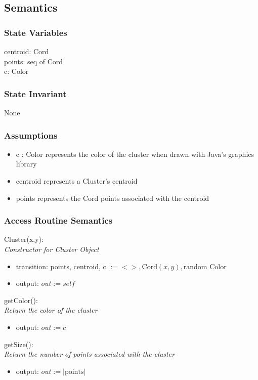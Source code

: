 \documentclass[12pt]{article}
\begin{document}
\subsection* {Semantics}

\subsubsection* {State Variables}
centroid: Cord\\
points: seq of Cord\\
c: Color

\subsubsection* {State Invariant}

None

\subsubsection* {Assumptions}
\begin{itemize}
\item c : Color represents the color of the cluster when drawn with Java's graphics
library
\item centroid represents a Cluster's centroid
\item points represents the Cord points associated with the centroid
\end{itemize}

\subsubsection* {Access Routine Semantics}

Cluster(x,y):\\
\textit{Constructor for Cluster Object}
\begin{itemize}
\item transition: points, centroid, c $:=  <>, \mbox{Cord}(x,y), \mbox{random Color}$
\item output: $out := \mathit{self}$
\end{itemize}

\noindent
getColor():\\
\textit{Return the color of the cluster}
\begin{itemize}
\item output: $out := c$
\end{itemize}

\noindent
getSize():\\
\textit{Return the number of points associated with the cluster}
\begin{itemize}
\item output: $out := |\mbox{points}|$
\end{itemize}
\end{document}
